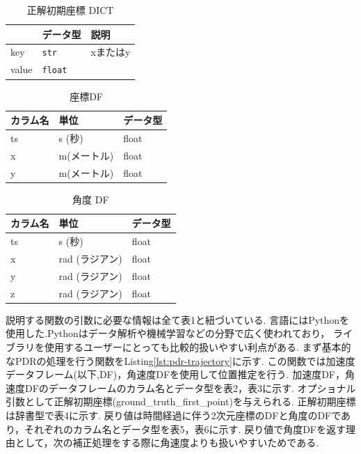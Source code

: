 \begin{table}[ht]
	\centering
	\label{tab:first-coord-dict}
	\begin{tabular}{lll}
		\hline
		      & {データ型}         & {説明}          \\ \hline
		key   & \texttt{str}   & xまたはy         \\ \hline
		value & \texttt{float} & \makecell{座標} \\ \hline
	\end{tabular}
	\caption{正解初期座標 DICT}
\end{table}


\begin{table}[ht]
	\centering
	\begin{tabular}{lll}
		\toprule
		カラム名 & 単位      & データ型  \\
		\midrule
		ts   & s (秒)   & float \\
		x    & m(メートル) & float \\
		y    & m(メートル) & float \\
		\bottomrule
	\end{tabular}
	\caption{座標DF}
\end{table}


\begin{table}[ht]
	\centering
	\begin{tabular}{lll}
		\toprule
		カラム名 & 単位         & データ型  \\
		\midrule
		ts   & s (秒)      & float \\
		x    & rad (ラジアン) & float \\
		y    & rad (ラジアン) & float \\
		z    & rad (ラジアン) & float \\
		\bottomrule
	\end{tabular}
	\caption{角度 DF}
\end{table}

説明する関数の引数に必要な情報は全て表1と紐づいている.
言語にはPythonを使用した.Pythonはデータ解析や機械学習などの分野で広く使われており，
ライブラリを使用するユーザーにとっても比較的扱いやすい利点がある.
まず基本的なPDRの処理を行う関数をListing\ref{lst:pdr-trajectory}に示す.
この関数では加速度データフレーム(以下,DF)，角速度DFを使用して位置推定を行う.
加速度DF，角速度DFのデータフレームのカラム名とデータ型を表2，表3に示す.
オプショナル引数として正解初期座標(ground\_truth\_first\_point)を与えられる.
正解初期座標は辞書型で表4に示す.
戻り値は時間経過に伴う2次元座標のDFと角度のDFであり，それぞれのカラム名とデータ型を表5，表6に示す.
戻り値で角度DFを返す理由として，次の補正処理をする際に角速度よりも扱いやすいためである.

